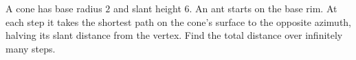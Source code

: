 A cone has base radius $2$ and slant height $6$. An ant starts on the base rim. At each step it takes the shortest path on the cone's surface to the opposite azimuth, halving its slant distance from the vertex. Find the total distance over infinitely many steps.
